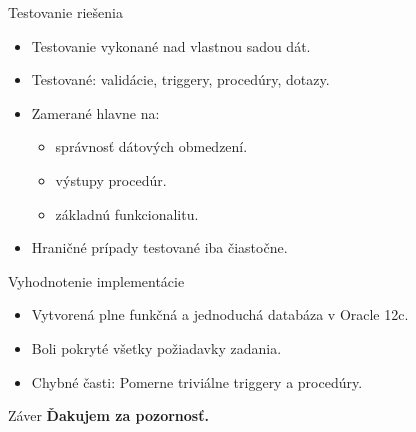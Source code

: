 \documentclass[10pt, hyperref={unicode}]{beamer}
\begin{document}
\begin{frame}[fragile]{Testovanie riešenia}
    \begin{itemize}
        \item Testovanie vykonané nad vlastnou sadou dát.
        \pause
        \item Testované: validácie, triggery, procedúry, dotazy.
        \pause
        \item Zamerané hlavne na:
        \begin{itemize}
            \item správnosť dátových obmedzení.
            \item výstupy procedúr.
            \item základnú funkcionalitu.
        \end{itemize}
        \pause
        \item Hraničné prípady testované iba čiastočne.
    \end{itemize}
\end{frame}


\begin{frame}[fragile]{Vyhodnotenie implementácie}
    \begin{itemize}
        \item Vytvorená plne funkčná a jednoduchá databáza v Oracle 12c.
        \pause
        \item Boli pokryté všetky požiadavky zadania.
        \pause
        \item Chybné časti: Pomerne triviálne triggery a procedúry.
        
    \end{itemize}
\end{frame}

\begin{frame}[c]{Záver}
    \centering
    \Huge \textbf{Ďakujem za pozornosť.}\\[1.5em]
\end{frame}
\end{document}
